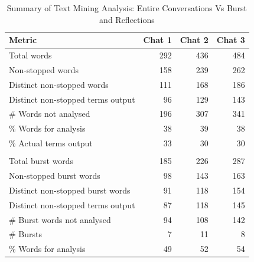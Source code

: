 \begin {table}[]
\caption {Summary of Text Mining Analysis: Entire Conversations Vs Burst and Reflections} 
\label{tab:chapt7_study1_tab2}
\begin{center}
\begin{tabular}{| p{6.8cm} | p{1.5cm} | p{1.5cm} | p{1.5cm} |} \hline \textbf{Metric} & \textbf{Chat 1} & \textbf{Chat 2} & \textbf{Chat 3} 
\\ \hline Total words & \multicolumn{0}{|r|}{292} & \multicolumn{0}{|r|}{436} & \multicolumn{0}{|r|}{484} 
\\ \hline Non-stopped words & \multicolumn{0}{|r|}{158} & \multicolumn{0}{|r|}{239} & \multicolumn{0}{|r|}{262} 
\\ \hline Distinct non-stopped words & \multicolumn{0}{|r|}{111} & \multicolumn{0}{|r|}{168} & \multicolumn{0}{|r|}{186}
\\ \hline Distinct non-stopped terms output & \multicolumn{0}{|r|}{96} & \multicolumn{0}{|r|}{129} & \multicolumn{0}{|r|}{143} 
\\ \hline \# Words not analysed & \multicolumn{0}{|r|}{196} & \multicolumn{0}{|r|}{307} & \multicolumn{0}{|r|}{341} 
\\ \hline \% Words for analysis & \multicolumn{0}{|r|}{38} & \multicolumn{0}{|r|}{39} & \multicolumn{0}{|r|}{38} 
\\ \hline \% Actual terms output & \multicolumn{0}{|r|}{33} & \multicolumn{0}{|r|}{30} & \multicolumn{0}{|r|}{30} 
\\ \hline & & & 
\\ \hline Total burst words & \multicolumn{0}{|r|}{185} & \multicolumn{0}{|r|}{226} & \multicolumn{0}{|r|}{287} 
\\ \hline Non-stopped burst words & \multicolumn{0}{|r|}{98} & \multicolumn{0}{|r|}{143} & \multicolumn{0}{|r|}{163} 
\\ \hline Distinct non-stopped burst words & \multicolumn{0}{|r|}{91} & \multicolumn{0}{|r|}{118} & \multicolumn{0}{|r|}{154} 
\\ \hline Distinct non-stopped terms output & \multicolumn{0}{|r|}{87} & \multicolumn{0}{|r|}{118} & \multicolumn{0}{|r|}{145} 
\\ \hline \# Burst words not analysed & \multicolumn{0}{|r|}{94} & \multicolumn{0}{|r|}{108} & \multicolumn{0}{|r|}{142} 
\\ \hline \# Bursts & \multicolumn{0}{|r|}{7} & \multicolumn{0}{|r|}{11} & \multicolumn{0}{|r|}{8} 
\\ \hline \% Words for analysis & \multicolumn{0}{|r|}{49} & \multicolumn{0}{|r|}{52} & \multicolumn{0}{|r|}{54} 

\end{tabular}
\end{center}
\end{table}
